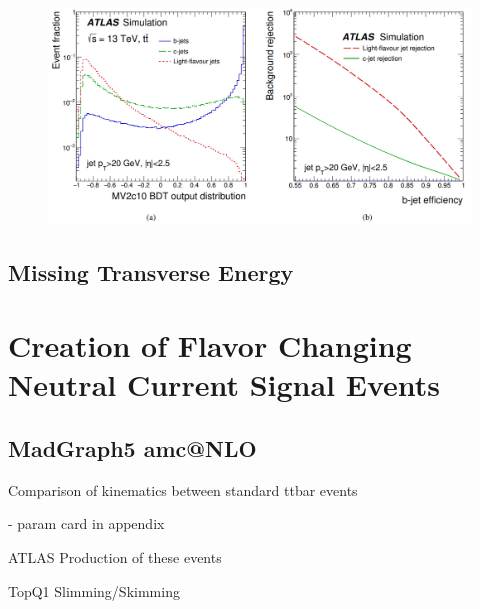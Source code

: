 \begin{figure}[h!]
	\centering
	\includegraphics[width=\columnwidth]{../ThesisImages/Simulation/BTagMV2c10andRejVsEff.png}
	\caption[C]{\cite{Takubo:2017wvt} 
	}
	\label{fig:BTag}
\end{figure}


\label{sec:bjetReco}

\subsection{Missing Transverse Energy}
\cite{METreco}

\section{Creation of Flavor Changing Neutral Current Signal Events}
\label{Sec:MG5Sig}
\subsection{MadGraph5 amc@NLO}
Comparison of kinematics between standard ttbar events

- param card in appendix

ATLAS Production of these events

TopQ1 Slimming/Skimming








